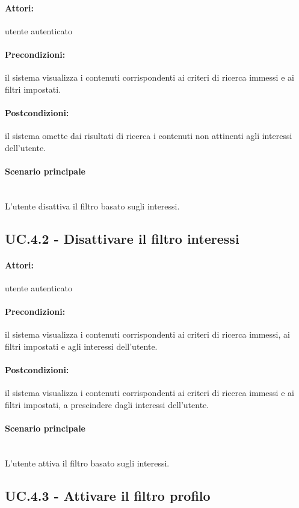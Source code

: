 \documentclass[10pt,a4paper,headinclude,footinclude,hidelinks]{scrreprt} %
\begin{document}
	\paragraph{Attori:} utente autenticato
	\paragraph{Precondizioni:} il sistema visualizza i contenuti corrispondenti ai criteri di ricerca immessi e ai filtri impostati.
	\paragraph{Postcondizioni:} il sistema omette dai risultati di ricerca i contenuti non attinenti agli interessi dell'utente.
	\paragraph{Scenario principale} \hfill \\
	L'utente disattiva il filtro basato sugli interessi.

	\subsection[UC.4.2]{UC.4.2 - Disattivare il filtro interessi}
	\label{sec:stage:ar:uc:4_2}
	\paragraph{Attori:} utente autenticato
	\paragraph{Precondizioni:} il sistema visualizza i contenuti corrispondenti ai criteri di ricerca immessi, ai filtri impostati e agli interessi dell'utente.
	\paragraph{Postcondizioni:} il sistema visualizza i contenuti corrispondenti ai criteri di ricerca immessi e ai filtri impostati, a prescindere dagli interessi dell'utente.
	\paragraph{Scenario principale} \hfill \\
	L'utente attiva il filtro basato sugli interessi.

	\subsection[UC.4.3]{UC.4.3 - Attivare il filtro profilo}
	\label{sec:stage:ar:uc:4_3}
\end{document}
